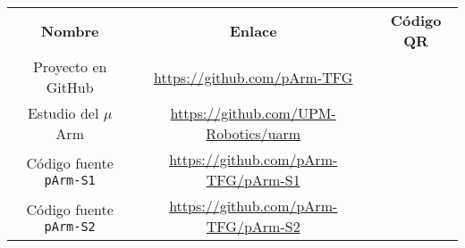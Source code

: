 \begin{longtable}{ C{0.5} C{0.5} C{0.5} }
    \hline
    \textbf{Nombre} & \textbf{Enlace} & \textbf{Código QR} \\[2ex]
    Proyecto en GitHub & \url{https://github.com/pArm-TFG} &  \\[5ex]
    Estudio del $\mu$Arm & \url{https://github.com/UPM-Robotics/uarm} &  \\[5ex]
    Código fuente \texttt{pArm-S1} & \url{https://github.com/pArm-TFG/pArm-S1} &  \\[5ex]
    Código fuente \texttt{pArm-S2} & \url{https://github.com/pArm-TFG/pArm-S2} &  \\[5ex]
    \hline
\end{longtable}